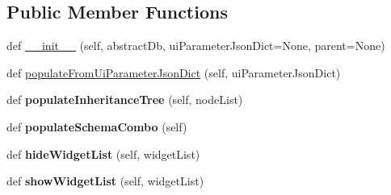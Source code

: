 \subsection*{Public Member Functions}
\begin{DoxyCompactItemize}
\item 
def \mbox{\hyperlink{class_dsg_tools_1_1_custom_widgets_1_1_custom_db_management_widgets_1_1change_filter_widget_1_1_change_filter_widget_a379dab3d52d128e25e3d6b69b1a4e986}{\+\_\+\+\_\+init\+\_\+\+\_\+}} (self, abstract\+Db, ui\+Parameter\+Json\+Dict=None, parent=None)
\item 
def \mbox{\hyperlink{class_dsg_tools_1_1_custom_widgets_1_1_custom_db_management_widgets_1_1change_filter_widget_1_1_change_filter_widget_a05e71bee08fa2f3dcc25546f6feaf891}{populate\+From\+Ui\+Parameter\+Json\+Dict}} (self, ui\+Parameter\+Json\+Dict)
\item 
\mbox{\label{class_dsg_tools_1_1_custom_widgets_1_1_custom_db_management_widgets_1_1change_filter_widget_1_1_change_filter_widget_af3d4502957dbf7137f1e64b581aa275d}} 
def {\bfseries populate\+Inheritance\+Tree} (self, node\+List)
\item 
\mbox{\label{class_dsg_tools_1_1_custom_widgets_1_1_custom_db_management_widgets_1_1change_filter_widget_1_1_change_filter_widget_a78d9f1bfa5cfd2844d152e4e3120cdc0}} 
def {\bfseries populate\+Schema\+Combo} (self)
\item 
\mbox{\label{class_dsg_tools_1_1_custom_widgets_1_1_custom_db_management_widgets_1_1change_filter_widget_1_1_change_filter_widget_abc363d13d7bc6648436e8099627f4461}} 
def {\bfseries hide\+Widget\+List} (self, widget\+List)
\item 
\mbox{\label{class_dsg_tools_1_1_custom_widgets_1_1_custom_db_management_widgets_1_1change_filter_widget_1_1_change_filter_widget_abcb0a72cf6ec1ed6df45d39c18cec406}} 
def {\bfseries show\+Widget\+List} (self, widget\+List)

\end{DoxyCompactItemize}

